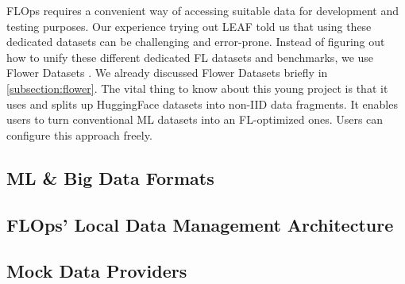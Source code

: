 FLOps requires a convenient way of accessing suitable data for development and testing purposes.
Our experience trying out LEAF told us that using these dedicated datasets can be challenging and error-prone.
Instead of figuring out how to unify these different dedicated FL datasets and benchmarks, we use Flower Datasets \cite{flower:datasets}.
We already discussed Flower Datasets briefly in \ref{subsection:flower}.
The vital thing to know about this young project is that it uses and splits up HuggingFace datasets into non-IID data fragments.
It enables users to turn conventional ML datasets into an FL-optimized ones.
Users can configure this approach freely.


\subsection{ML \& Big Data Formats}

\subsection{FLOps' Local Data Management Architecture}

\subsection{Mock Data Providers}
